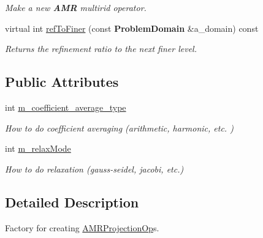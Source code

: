 \begin{DoxyCompactItemize}
\begin{DoxyCompactList}\small\item\em Make a new \textbf{ A\+MR} multirid operator. \end{DoxyCompactList}\item 
\mbox{\label{class_a_m_r_projection_op_factory_a09ad311fa562078ed94956e2e294924c}} 
virtual int \hyperlink{class_a_m_r_projection_op_factory_a09ad311fa562078ed94956e2e294924c}{ref\+To\+Finer} (const \textbf{ Problem\+Domain} \&a\+\_\+domain) const
\begin{DoxyCompactList}\small\item\em Returns the refinement ratio to the next finer level. \end{DoxyCompactList}\end{DoxyCompactItemize}
\subsection*{Public Attributes}
\begin{DoxyCompactItemize}
\item 
\mbox{\label{class_a_m_r_projection_op_factory_ae1f06f5aecde3e3c1d157abd59fe8d44}} 
int \hyperlink{class_a_m_r_projection_op_factory_ae1f06f5aecde3e3c1d157abd59fe8d44}{m\+\_\+coefficient\+\_\+average\+\_\+type}
\begin{DoxyCompactList}\small\item\em How to do coefficient averaging (arithmetic, harmonic, etc. ) \end{DoxyCompactList}\item 
\mbox{\label{class_a_m_r_projection_op_factory_a3171ba31fdb78862e5222a094989d15b}} 
int \hyperlink{class_a_m_r_projection_op_factory_a3171ba31fdb78862e5222a094989d15b}{m\+\_\+relax\+Mode}
\begin{DoxyCompactList}\small\item\em How to do relaxation (gauss-\/seidel, jacobi, etc.) \end{DoxyCompactList}\end{DoxyCompactItemize}


\subsection{Detailed Description}
Factory for creating \hyperlink{class_a_m_r_projection_op}{A\+M\+R\+Projection\+Op}\textquotesingle{}s. 

